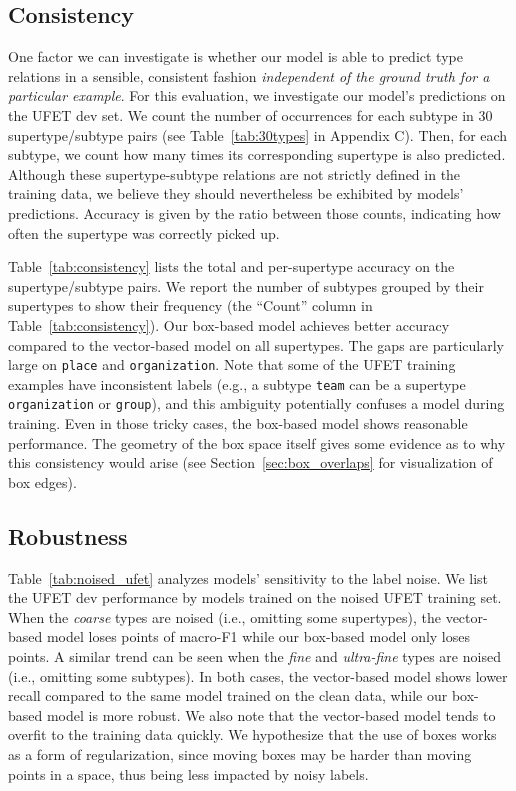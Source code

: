 \documentclass[11pt,a4paper]{article}
\begin{document}
\subsection{Consistency}

One factor we can investigate is whether our model is able to predict type relations in a sensible, consistent fashion \emph{independent of the ground truth for a particular example}. For this evaluation, we investigate our model's predictions on the UFET dev set. We count the number of occurrences for each subtype in 30 supertype/subtype pairs (see Table~\ref{tab:30types} in Appendix C). Then, for each subtype, we count how many times its corresponding supertype is also predicted. Although these supertype-subtype relations are not strictly defined in the training data, we believe they should nevertheless be exhibited by models' predictions. Accuracy is given by the ratio between those counts, indicating how often the supertype was correctly picked up.

Table~\ref{tab:consistency} lists the total and per-supertype accuracy on the supertype/subtype pairs. We report the number of subtypes grouped by their supertypes to show their frequency (the ``Count'' column in Table~\ref{tab:consistency}). Our box-based model achieves better accuracy compared to the vector-based model on all supertypes. The gaps are particularly large on {\tt place} and {\tt organization}. Note that some of the UFET training examples have inconsistent labels (e.g., a subtype {\tt team} can be a supertype {\tt organization} or {\tt group}), and this ambiguity potentially confuses a model during training. Even in those tricky cases, the box-based model shows reasonable performance. The geometry of the box space itself gives some evidence as to why this consistency would arise (see Section~\ref{sec:box_overlaps} for visualization of box edges).





\subsection{Robustness}
Table~\ref{tab:noised_ufet} analyzes models' sensitivity to the label noise. We list the UFET dev performance by models trained on the noised UFET training set. When the \emph{coarse} types are noised (i.e., omitting some supertypes), the vector-based model loses  points of macro-F1 while our box-based model only loses  points. A similar trend can be seen when the \emph{fine} and \emph{ultra-fine} types are noised (i.e., omitting some subtypes). In both cases, the vector-based model shows lower recall compared to the same model trained on the clean data, while our box-based model is more robust. We also note that the vector-based model tends to overfit to the training data quickly. We hypothesize that the use of boxes works as a form of regularization, since moving boxes may be harder than moving points in a space, thus being less impacted by noisy labels.
\end{document}
